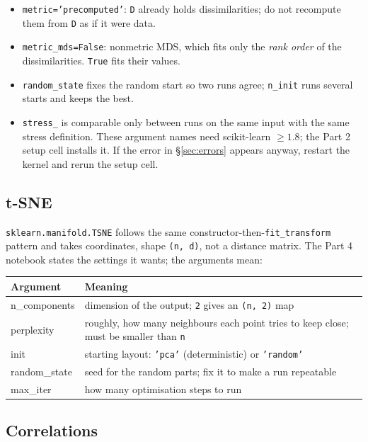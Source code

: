 \documentclass[11pt]{article}
\begin{document}
\begin{itemize}
\item \texttt{metric='precomputed'}: \texttt{D} already holds dissimilarities; do not
      recompute them from \texttt{D} as if it were data.
\item \texttt{metric\_mds=False}: nonmetric MDS, which fits only the \emph{rank order} of
      the dissimilarities. \texttt{True} fits their values.
\item \texttt{random\_state} fixes the random start so two runs agree; \texttt{n\_init}
      runs several starts and keeps the best.
\item \texttt{stress\_} is comparable only between runs on the same input with the same
      stress definition. These argument names need scikit-learn $\geq 1.8$; the Part 2
      setup cell installs it. If the error in \S\ref{sec:errors} appears anyway, restart the kernel and
      rerun the setup cell.
\end{itemize}

\subsection{t-SNE}

\texttt{sklearn.manifold.TSNE} follows the same constructor-then-\texttt{fit\_transform}
pattern and takes coordinates, shape \texttt{(n, d)}, not a distance matrix. The Part 4
notebook states the settings it wants; the arguments mean:

\begin{center}
\small
\begin{tabular}{@{}>{\ttfamily}l p{9.6cm}@{}}
\toprule
\textnormal{\textbf{Argument}} & \textbf{Meaning} \\
\midrule
n\_components & dimension of the output; \texttt{2} gives an \texttt{(n, 2)} map \\
perplexity    & roughly, how many neighbours each point tries to keep close; must be smaller than \texttt{n} \\
init          & starting layout: \texttt{'pca'} (deterministic) or \texttt{'random'} \\
random\_state & seed for the random parts; fix it to make a run repeatable \\
max\_iter     & how many optimisation steps to run \\
\bottomrule
\end{tabular}
\end{center}

\subsection{Correlations}
\end{document}
